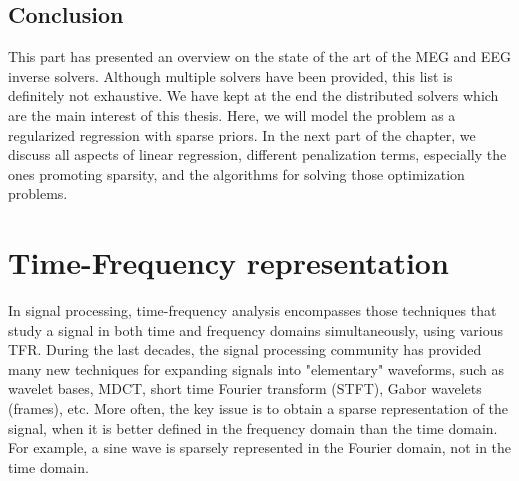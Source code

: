 




\subsection{Conclusion}
This part has presented an overview on the state of the art of the MEG and EEG inverse solvers. Although multiple solvers have been provided, this list is definitely not exhaustive.
We have kept at the end the distributed solvers which are the main interest of this thesis. Here, we will model the problem as a regularized regression with sparse priors. In the next part of the chapter, we discuss all aspects of linear regression, different penalization terms, especially the ones promoting sparsity, and the algorithms for solving those optimization problems.

\section{Time-Frequency representation}
\label{section:TF}
In signal processing, time-frequency analysis encompasses those techniques that study a signal in both time and frequency domains simultaneously, using various \ac{TFR}. During the last decades, the signal processing community has provided many new techniques for expanding signals into "elementary" waveforms, such as wavelet bases, \ac{MDCT}, short time Fourier transform (STFT), Gabor wavelets (frames), etc. More often, the key issue is to obtain a sparse representation of the signal, when it is better defined in the frequency domain than the time domain. For example, a sine wave is sparsely represented in the Fourier domain, not in the time domain.\\

